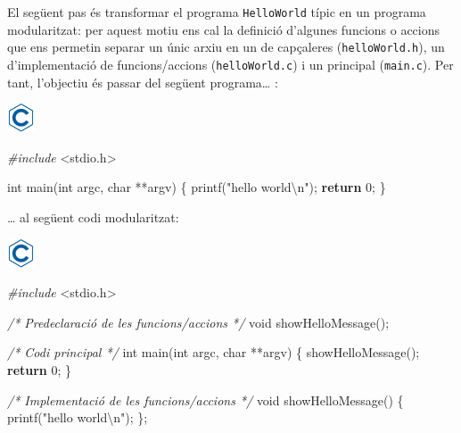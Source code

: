 \documentclass[
]{book}
\newenvironment{Shaded}{\begin{snugshade}}{\end{snugshade}}
\newcommand{\CommentTok}[1]{\textcolor[rgb]{0.56,0.35,0.01}{\textit{#1}}}
\newcommand{\ControlFlowTok}[1]{\textcolor[rgb]{0.13,0.29,0.53}{\textbf{#1}}}
\newcommand{\DataTypeTok}[1]{\textcolor[rgb]{0.13,0.29,0.53}{#1}}
\newcommand{\DecValTok}[1]{\textcolor[rgb]{0.00,0.00,0.81}{#1}}
\newcommand{\ImportTok}[1]{#1}
\newcommand{\NormalTok}[1]{#1}
\newcommand{\PreprocessorTok}[1]{\textcolor[rgb]{0.56,0.35,0.01}{\textit{#1}}}
\newcommand{\SpecialCharTok}[1]{\textcolor[rgb]{0.00,0.00,0.00}{#1}}
\newcommand{\StringTok}[1]{\textcolor[rgb]{0.31,0.60,0.02}{#1}}
\begin{document}
El següent pas és transformar el programa \texttt{HelloWorld} típic en un programa modularitzat: per aquest motiu ens cal la definició d'algunes funcions o accions que ens permetin separar un únic arxiu en un de capçaleres (\texttt{helloWorld.h}), un d'implementació de funcions/accions (\texttt{helloWorld.c}) i un principal (\texttt{main.c}). Per tant, l'objectiu és passar del següent programa\ldots{} :

\includegraphics{./img/c.png}

\begin{Shaded}
\begin{Highlighting}[]
\PreprocessorTok{\#include }\ImportTok{\textless{}stdio.h\textgreater{}}

\DataTypeTok{int}\NormalTok{ main(}\DataTypeTok{int}\NormalTok{ argc, }\DataTypeTok{char}\NormalTok{ **argv) \{}
\NormalTok{    printf(}\StringTok{"hello world}\SpecialCharTok{\textbackslash{}n}\StringTok{"}\NormalTok{);}
    \ControlFlowTok{return} \DecValTok{0}\NormalTok{;}
\NormalTok{\}}
\end{Highlighting}
\end{Shaded}

\ldots{} al següent codi modularitzat:

\includegraphics{./img/c.png}

\begin{Shaded}
\begin{Highlighting}[]
\PreprocessorTok{\#include }\ImportTok{\textless{}stdio.h\textgreater{}}

\CommentTok{/* Predeclaració de les funcions/accions */}
\DataTypeTok{void}\NormalTok{ showHelloMessage();}

\CommentTok{/* Codi principal */}
\DataTypeTok{int}\NormalTok{ main(}\DataTypeTok{int}\NormalTok{ argc, }\DataTypeTok{char}\NormalTok{ **argv) \{}
\NormalTok{    showHelloMessage();}
    \ControlFlowTok{return} \DecValTok{0}\NormalTok{;}
\NormalTok{\}}

\CommentTok{/* Implementació de les funcions/accions */}
\DataTypeTok{void}\NormalTok{ showHelloMessage() \{}
\NormalTok{    printf(}\StringTok{"hello world}\SpecialCharTok{\textbackslash{}n}\StringTok{"}\NormalTok{);}
\NormalTok{\};}
\end{Highlighting}
\end{Shaded}
\end{document}
